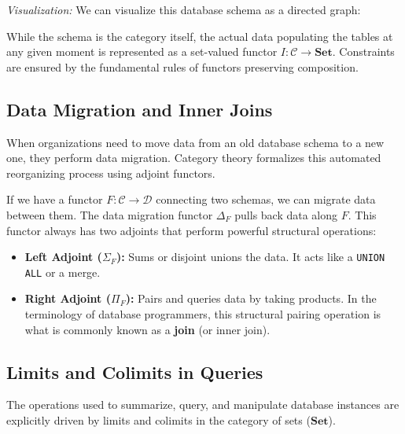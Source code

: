 \documentclass{article}
\begin{document}
\textit{Visualization:} We can visualize this database schema as a directed graph:
\begin{center}
\end{center}

While the schema is the category itself, the actual data populating the tables at any given moment is represented as a set-valued functor $I: \mathcal{C} \to \mathbf{Set}$. Constraints are ensured by the fundamental rules of functors preserving composition.

\subsection{Data Migration and Inner Joins}
When organizations need to move data from an old database schema to a new one, they perform data migration. Category theory formalizes this automated reorganizing process using adjoint functors. 

If we have a functor $F: \mathcal{C} \to \mathcal{D}$ connecting two schemas, we can migrate data between them. The data migration functor $\Delta_F$ pulls back data along $F$. This functor always has two adjoints that perform powerful structural operations:
\begin{itemize}
    \item \textbf{Left Adjoint ($\Sigma_F$):} Sums or disjoint unions the data. It acts like a \texttt{UNION ALL} or a merge.
    \item \textbf{Right Adjoint ($\Pi_F$):} Pairs and queries data by taking products. In the terminology of database programmers, this structural pairing operation is what is commonly known as a \textbf{join} (or inner join). 
\end{itemize}

\subsection{Limits and Colimits in Queries}
The operations used to summarize, query, and manipulate database instances are explicitly driven by limits and colimits in the category of sets ($\mathbf{Set}$).
\end{document}
